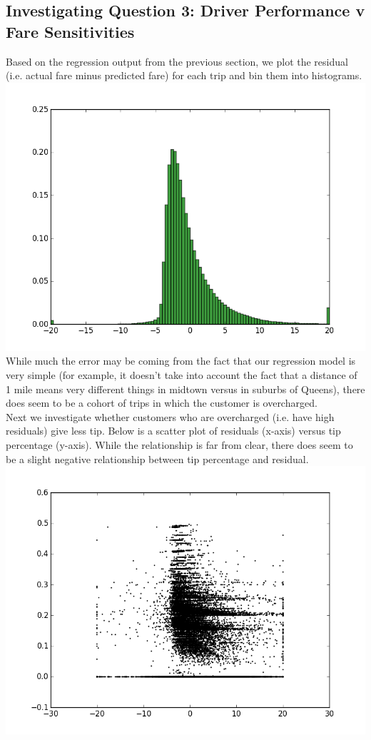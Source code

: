 \documentclass[twoside]{article}
\begin{document}
\begin{multicols}{2}
\section{Investigating Question 3: Driver Performance v Fare Sensitivities}
Based on the regression output from the previous section, we plot the residual (i.e. actual fare minus predicted fare) for each trip and bin them into histograms.  
\includegraphics[scale=.35]{figure_1.png}
While much the error may be coming from the fact that our regression model is very simple (for example, it doesn't take into account the fact that a distance of 1 mile means very different things in midtown versus in suburbs of Queens), there does seem to be a cohort of trips in which the customer is overcharged. \\
Next we investigate whether customers who are overcharged (i.e. have high residuals) give less tip. Below is a scatter plot of residuals (x-axis) versus tip percentage (y-axis). While the relationship is far from clear, there does seem to be a slight negative relationship between tip percentage and residual.
\includegraphics[scale=.35]{figure_2.png}


\end{multicols}
\end{document}
